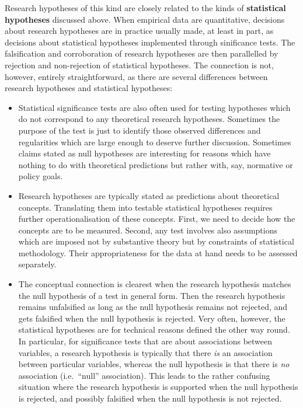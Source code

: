 Research hypotheses of this kind are closely related to the kinds of
\textbf{statistical hypotheses} discussed above. When
empirical data are quantitative, decisions about research hypotheses are
in practice usually made, at least in part, as decisions about
statistical hypotheses implemented through sinificance tests. The
falsification and corroboration of research hypotheses are then
parallelled by rejection and non-rejection of statistical hypotheses.
The connection is not, however, entirely straightforward, as
there are several differences between research hypotheses and
statistical hypotheses:
\begin{itemize}
\item
Statistical significance tests are also often used for testing
hypotheses which do not correspond to any theoretical research
hypotheses. Sometimes the purpose of the test is just to identify those
observed differences and regularities which are large enough to deserve
further discussion. Sometimes claims stated as null hypotheses are
interesting for reasons which have nothing to do with theoretical
predictions but rather with, say, normative or policy goals.
\item
Research hypotheses are typically stated as predictions about
theoretical concepts. Translating them into testable statistical
hypotheses requires further operationalisation of these concepts. First,
we need to decide how the concepts are to be measured. Second, any test
involves also assumptions which are imposed not
by substantive theory but by constraints of
statistical methodology. Their appropriateness for the data at hand
needs to be assessed separately.
\item
The conceptual connection is clearest when the research hypothesis
matches
the null hypothesis of a test in general form. Then the research hypothesis
remains unfalsified as long as the null
hypothesis remains not rejected, and gets
falsified when the null hypothesis is rejected. Very often, however, the
statistical hypotheses are for technical reasons
defined the other way round. In particular,
for significance tests that are about
associations between variables, a research hypothesis is typically
that there \emph{is} an association between particular variables,
whereas the null hypothesis is that there is \emph{no} association
(i.e.\ ``null'' association). This
leads to the rather confusing situation where the research hypothesis is
supported when the null hypothesis is rejected, and possibly falsified when the
null hypothesis is not rejected.
\end{itemize}


